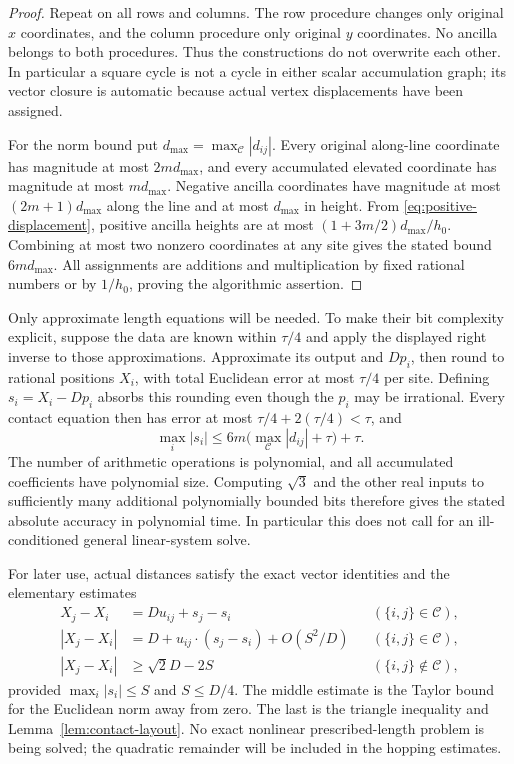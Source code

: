 \begin{proof}
Repeat on all rows and columns.  The row procedure changes only
original $x$ coordinates, and the column procedure only original
$y$ coordinates.  No ancilla belongs to both procedures.  Thus the
constructions do not overwrite each other.  In particular a square
cycle is not a cycle in either scalar accumulation graph; its vector
closure is automatic because actual vertex displacements have been
assigned.

For the norm bound put $d_{\max}=\max_{\mathcal C}|d_{ij}|$.
Every original along-line coordinate has magnitude at most
$2m d_{\max}$, and every accumulated elevated coordinate has
magnitude at most $m d_{\max}$.  Negative ancilla coordinates
have magnitude at most $(2m+1)d_{\max}$ along the line and at
most $d_{\max}$ in height.  From
\eqref{eq:positive-displacement}, positive ancilla heights are at
most $(1+3m/2)d_{\max}/h_0$.  Combining at most two nonzero
coordinates at any site gives the stated bound $6m d_{\max}$.
All assignments are additions and multiplication by fixed rational
numbers or by $1/h_0$, proving the algorithmic assertion.
\end{proof}

Only approximate length equations will be needed.  To make their bit
complexity explicit, suppose the data are known within $\tau/4$ and
apply the displayed right inverse to those approximations.  Approximate
its output and $Dp_i$, then round to rational positions $X_i$, with
total Euclidean error at most $\tau/4$ per site.  Defining
$s_i=X_i-Dp_i$ absorbs this rounding even though the $p_i$ may be
irrational.  Every contact equation then has error at most
$\tau/4+2(\tau/4)<\tau$, and
\begin{equation}\label{eq:rounded-displacement}
 \max_i|s_i|\leq6m\bigl(\max_{\mathcal C}|d_{ij}|+\tau\bigr)+\tau.
\end{equation}
The number of arithmetic operations is polynomial, and all accumulated
coefficients have polynomial size.  Computing $\sqrt3$ and the other
real inputs to sufficiently many additional polynomially bounded bits
therefore gives the stated absolute accuracy in polynomial time.
In particular this does not call for an ill-conditioned general
linear-system solve.

For later use, actual distances satisfy the exact vector identities
and the elementary estimates
\begin{equation}\label{eq:displaced-geometric-bounds}
 \begin{aligned}
 X_j-X_i&=D u_{ij}+s_j-s_i
                       &&(\{i,j\}\in\mathcal C),\\
 |X_j-X_i|&=D+u_{ij}\cdot(s_j-s_i)+O(S^2/D)
                       &&(\{i,j\}\in\mathcal C),\\
 |X_j-X_i|&\geq\sqrt2D-2S
                       &&(\{i,j\}\notin\mathcal C),
 \end{aligned}
\end{equation}
provided $\max_i|s_i|\leq S$ and $S\leq D/4$.  The middle estimate
is the Taylor bound for the Euclidean norm away from zero.  The last
is the triangle inequality and Lemma~\ref{lem:contact-layout}.
No exact nonlinear prescribed-length problem is being solved; the
quadratic remainder will be included in the hopping estimates.

